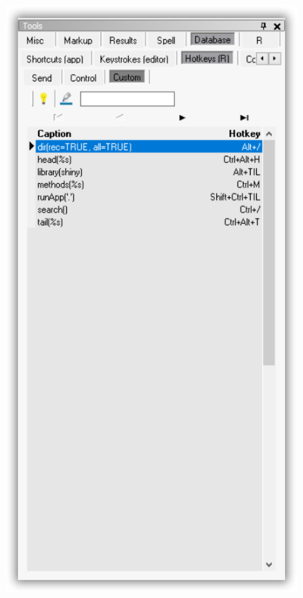 \begin{figure}[H]
  \includegraphics[scale=0.35]{./res/tools_database_rh_custom.png}~~

\end{figure}
